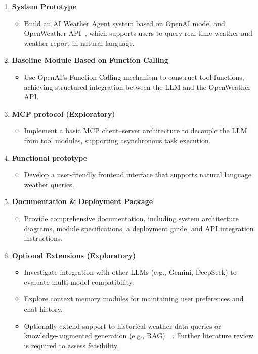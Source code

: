 \documentclass[project-plan]{report-template}
\begin{document}
\begin{enumerate}
  \item \textbf{System Prototype}
  \begin{itemize}
    \item Build an AI Weather Agent system based on OpenAI model and OpenWeather API~\cite{Cao2024}, which supports users to query real-time weather and weather report in natural language.

  \end{itemize}

  \item \textbf{Baseline Module Based on Function Calling}
  \begin{itemize}
    \item Use OpenAI’s Function Calling mechanism to construct tool functions, achieving structured integration between the LLM and the OpenWeather API.

  \end{itemize}

  \item \textbf{MCP protocol (Exploratory)}
  \begin{itemize}
    \item Implement a basic MCP client–server architecture to decouple the LLM from tool modules, supporting asynchronous task execution.

  \end{itemize}


  \item \textbf{Functional prototype}
  \begin{itemize}
    \item Develop a user-friendly frontend interface that supports natural language weather queries.
  \end{itemize}

  \item \textbf{Documentation \& Deployment Package}
  \begin{itemize}
    \item Provide comprehensive documentation, including system architecture diagrams, module specifications, a deployment guide, and API integration instructions.
  \end{itemize}

  \item \textbf{Optional Extensions (Exploratory)}
  \begin{itemize}
    \item Investigate integration with other LLMs (e.g., Gemini, DeepSeek) to evaluate multi-model compatibility.
    \item Explore context memory modules for maintaining user preferences and chat history.~\cite{LDAgent}
    \item Optionally extend support to historical weather data queries or knowledge-augmented generation (e.g., RAG)~\cite{GaoYunfan2023}~\cite{Jeong2024}. Further literature review is required to assess feasibility.
  \end{itemize}
\end{enumerate}
\end{document}
